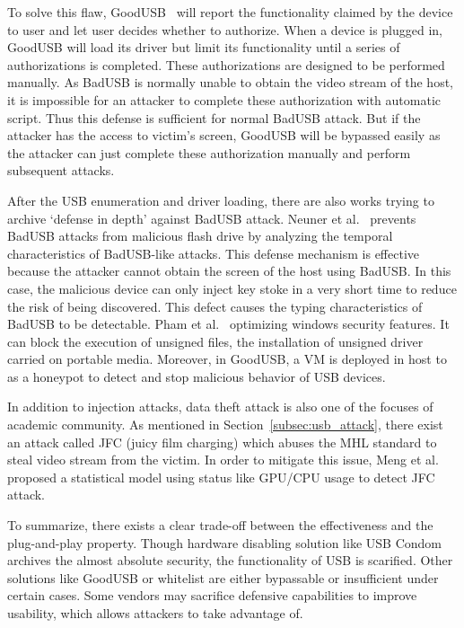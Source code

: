 To solve this flaw, GoodUSB~\cite{tian2015defending} will report the functionality claimed
by the device to user and let user decides whether to authorize. When a device
is plugged in, GoodUSB will load its driver but limit its functionality until a
series of authorizations is completed. These authorizations are designed to be
performed manually. As BadUSB is normally unable to obtain the video stream of
the host, it is impossible for an attacker to complete these authorization with
automatic script. Thus this defense is sufficient for normal BadUSB attack. But
if the attacker has the access to victim's screen, GoodUSB will be bypassed
easily as the attacker can just complete these authorization manually and
perform subsequent attacks.

After the USB enumeration and driver loading, there are also works trying to archive `defense in depth'
against BadUSB attack.  Neuner et
al.~\cite{neuner2018usblock} prevents BadUSB attacks from malicious flash drive by analyzing
the temporal characteristics of BadUSB-like attacks. This defense mechanism is
effective because the attacker cannot obtain the screen of the host using
BadUSB. In this case, the malicious device can only inject key stoke in a very
short time to reduce the risk of being discovered. This defect causes the
typing characteristics of BadUSB to be detectable. Pham et
al.~\cite{pham2010optimizing} optimizing windows security features. It can
block the execution of unsigned files, the installation of unsigned driver
carried on portable media. Moreover, in GoodUSB, a VM is deployed in host to as
a honeypot to detect and stop malicious behavior of USB devices.

In addition to injection attacks, data theft attack is also one of the focuses
of academic community. As mentioned in Section~\ref{subsec:usb_attack}, there
exist an attack called JFC (juicy film charging)\cite{JFC} which abuses the MHL
standard to steal video stream from the victim. In order to mitigate this
issue, Meng et al.\cite{meng2018252} proposed a statistical model using status
like GPU/CPU usage to detect JFC attack.

To summarize, there exists a clear trade-off between the effectiveness and the
plug-and-play property. Though hardware disabling solution like USB Condom
archives the almost absolute security, the functionality of USB is scarified.
Other solutions like GoodUSB or whitelist are either bypassable or insufficient
under certain cases.  Some vendors may sacrifice defensive capabilities to
improve usability, which allows attackers to take advantage of.

